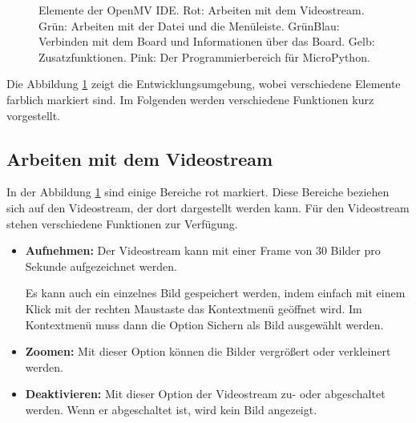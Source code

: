 \begin{figure}[H]
	\caption[Elemente der OpenMV IDE]{Elemente der OpenMV IDE. Rot: Arbeiten mit dem Videostream. Grün: Arbeiten mit der Datei und die Menüleiste. GrünBlau: Verbinden mit dem Board und Informationen über das Board. Gelb: Zusatzfunktionen. Pink: Der Programmierbereich für MicroPython.}
	\label{OpenMVElements}
\end{figure}

Die Abbildung \ref{OpenMVElements} zeigt die Entwicklungsumgebung, wobei verschiedene Elemente farblich markiert sind. Im Folgenden werden verschiedene Funktionen kurz vorgestellt.

\subsection{Arbeiten mit dem Videostream}


In der Abbildung \ref{OpenMVElements} sind einige Bereiche rot markiert. Diese Bereiche beziehen sich auf den Videostream, der dort dargestellt werden kann. Für den Videostream stehen verschiedene Funktionen zur Verfügung.

\begin{itemize}
  \item  \textbf{Aufnehmen:} Der Videostream kann mit einer Frame von 30 Bilder pro Sekunde aufgezeichnet werden. 
  
   Es kann auch ein einzelnes Bild gespeichert werden, indem einfach mit einem  Klick mit der  rechten Maustaste das Kontextmenü geöffnet wird. Im Kontextmenü muss dann die Option \glqq Sichern als Bild\grqq{} ausgewählt werden.
  \item \textbf{Zoomen:} Mit dieser Option können die Bilder    vergrößert oder verkleinert werden.
  \item \textbf{Deaktivieren:} Mit dieser Option der Videostream zu- oder abgeschaltet werden. Wenn er abgeschaltet ist, wird kein Bild angezeigt.
	
\end{itemize}


